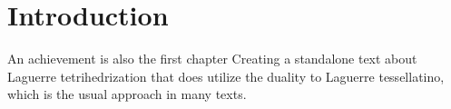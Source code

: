 \chapter*{Introduction}


An achievement is also the first chapter
Creating a standalone text about Laguerre tetrihedrization that does utilize the duality to Laguerre tessellatino, which is the usual approach in many texts. 

